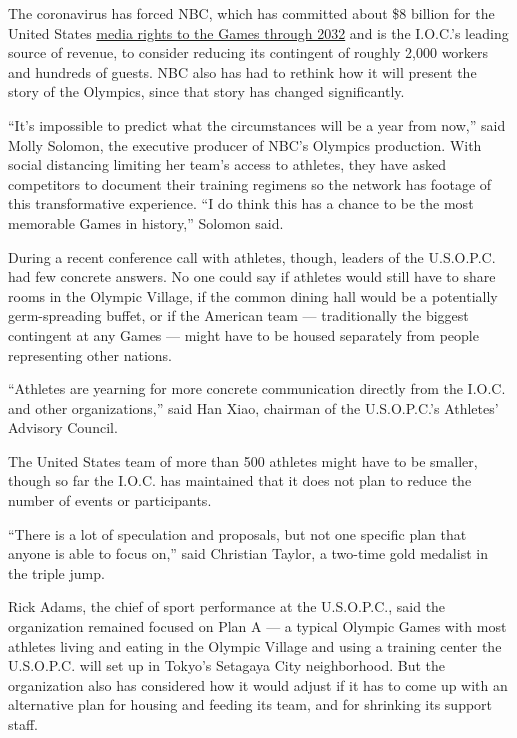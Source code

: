 The coronavirus has forced NBC, which has committed about \$8 billion
for the United States
\href{https://www.nytimes3xbfgragh.onion/2014/05/08/sports/olympics/nbc-extends-olympic-tv-deal-through-2032.html}{media
rights to the Games through 2032} and is the I.O.C.'s leading source of
revenue, to consider reducing its contingent of roughly 2,000 workers
and hundreds of guests. NBC also has had to rethink how it will present
the story of the Olympics, since that story has changed significantly.

``It's impossible to predict what the circumstances will be a year from
now,'' said Molly Solomon, the executive producer of NBC's Olympics
production. With social distancing limiting her team's access to
athletes, they have asked competitors to document their training
regimens so the network has footage of this transformative experience.
``I do think this has a chance to be the most memorable Games in
history,'' Solomon said.

During a recent conference call with athletes, though, leaders of the
U.S.O.P.C. had few concrete answers. No one could say if athletes would
still have to share rooms in the Olympic Village, if the common dining
hall would be a potentially germ-spreading buffet, or if the American
team --- traditionally the biggest contingent at any Games --- might
have to be housed separately from people representing other nations.

``Athletes are yearning for more concrete communication directly from
the I.O.C. and other organizations,'' said Han Xiao, chairman of the
U.S.O.P.C.'s Athletes' Advisory Council.

The United States team of more than 500 athletes might have to be
smaller, though so far the I.O.C. has maintained that it does not plan
to reduce the number of events or participants.

``There is a lot of speculation and proposals, but not one specific plan
that anyone is able to focus on,'' said Christian Taylor, a two-time
gold medalist in the triple jump.

Rick Adams, the chief of sport performance at the U.S.O.P.C., said the
organization remained focused on Plan A --- a typical Olympic Games with
most athletes living and eating in the Olympic Village and using a
training center the U.S.O.P.C. will set up in Tokyo's Setagaya City
neighborhood. But the organization also has considered how it would
adjust if it has to come up with an alternative plan for housing and
feeding its team, and for shrinking its support staff.

